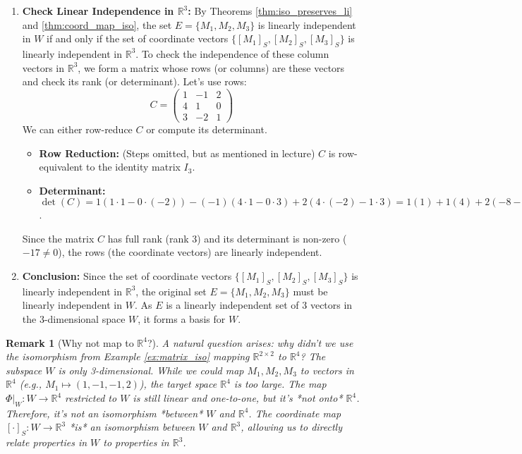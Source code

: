 \documentclass[11pt]{article}
\newtheorem{remark}[theorem]{Remark}
\theoremstyle{definition}
\theoremstyle{remark}
\newcommand{\R}{\mathbb{R}}
\newcommand{\mat}[1]{\begin{pmatrix}#1\end{pmatrix}}
\begin{document}
\begin{enumerate}
    \item \textbf{Check Linear Independence in $\R^3$:} By Theorems \ref{thm:iso_preserves_li} and \ref{thm:coord_map_iso}, the set $E = \{M_1, M_2, M_3\}$ is linearly independent in $W$ if and only if the set of coordinate vectors $\{[M_1]_S, [M_2]_S, [M_3]_S\}$ is linearly independent in $\R^3$.
    To check the independence of these column vectors in $\R^3$, we form a matrix whose rows (or columns) are these vectors and check its rank (or determinant). Let's use rows:
    \[ C = \mat{1 & -1 & 2 \\ 4 & 1 & 0 \\ 3 & -2 & 1} \]
    We can either row-reduce $C$ or compute its determinant.
    \begin{itemize}
        \item \textbf{Row Reduction:} (Steps omitted, but as mentioned in lecture) $C$ is row-equivalent to the identity matrix $I_3$.
        \item \textbf{Determinant:} $\det(C) = 1(1\cdot 1 - 0\cdot(-2)) - (-1)(4\cdot 1 - 0\cdot 3) + 2(4\cdot(-2) - 1\cdot 3) = 1(1) + 1(4) + 2(-8-3) = 1 + 4 + 2(-11) = 5 - 22 = -17$.
    \end{itemize}
    Since the matrix $C$ has full rank (rank 3) and its determinant is non-zero ($-17 \neq 0$), the rows (the coordinate vectors) are linearly independent.

    \item \textbf{Conclusion:} Since the set of coordinate vectors $\{[M_1]_S, [M_2]_S, [M_3]_S\}$ is linearly independent in $\R^3$, the original set $E = \{M_1, M_2, M_3\}$ must be linearly independent in $W$. As $E$ is a linearly independent set of 3 vectors in the 3-dimensional space $W$, it forms a basis for $W$.
\end{enumerate} %

\begin{remark}[Why not map to $\R^4$?]
A natural question arises: why didn't we use the isomorphism from Example \ref{ex:matrix_iso} mapping $\R^{2 \times 2}$ to $\R^4$? The subspace $W$ is only 3-dimensional. While we could map $M_1, M_2, M_3$ to vectors in $\R^4$ (e.g., $M_1 \mapsto (1, -1, -1, 2)$), the target space $\R^4$ is too large. The map $\Phi|_{W}: W \to \R^4$ restricted to $W$ is still linear and one-to-one, but it's *not onto* $\R^4$. Therefore, it's not an isomorphism *between* $W$ and $\R^4$. The coordinate map $[\cdot]_S: W \to \R^3$ *is* an isomorphism between $W$ and $\R^3$, allowing us to directly relate properties in $W$ to properties in $\R^3$.
\end{remark}
\end{document}
